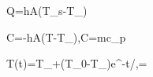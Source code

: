 \dot Q=hA(T_s-T_\infty)

C=-hA(T-T_\infty),\qquad C=mc_p

T(t)=T_\infty+(T_0-T_\infty)e^{-t/\tau},\qquad\tau=
